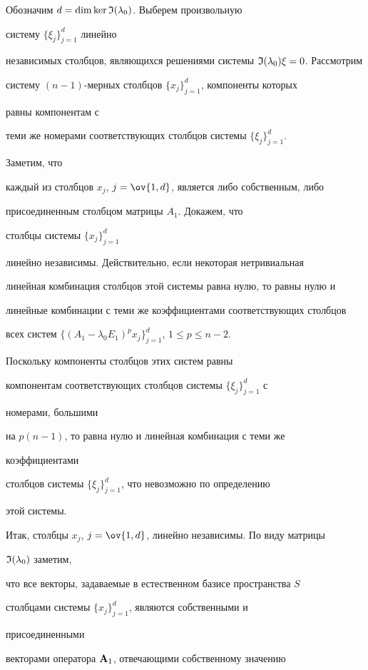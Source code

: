 \begin{pf} 


Обозначим $d=\dim\ker\frak I(\lambda_0)$. Выберем произвольную 


систему $\{\xi_j\}^d_{j=1}$ линейно 


независимых столбцов, являющихся решениями системы $\frak 


I(\lambda_0)\xi=0$. Рассмотрим 


систему $(n-1)$-мерных столбцов $\{x_j\}^d_{j=1}$, компоненты которых 


равны компонентам с 


теми же номерами соответствующих столбцов системы $\{\xi_j\}^d_{j=1}$. 


Заметим, что 


каждый из столбцов $x_j$, $j=\ov{1,d}$, является либо собственным, либо 


присоединенным столбцом матрицы $A_1$. Докажем, что 


столбцы системы $\{x_j\}^d_{j=1}$ 


линейно независимы. Действительно, если некоторая нетривиальная 


линейная комбинация столбцов этой системы равна нулю, то равны нулю и 


линейные комбинации с теми же коэффициентами соответствующих столбцов


всех систем $\{(A_1-\lambda_0E_1)^p x_j\}^d_{j=1}$, $1\le p\le n-2$. 


Поскольку компоненты столбцов этих систем равны 


компонентам соответствующих столбцов системы $\{\xi_j\}^d_{j=1}$ с 


номерами, большими 


на $p(n-1)$, то равна нулю и линейная комбинация с теми же 


коэффициентами 


столбцов системы $\{\xi_j\}^d_{j=1}$, что невозможно по определению 


этой системы. 


Итак, столбцы $x_j$, $j=\ov{1,d}$, линейно независимы. По виду матрицы 


$\frak I(\lambda_0)$ заметим, 


что все векторы, задаваемые в естественном базисе пространства $S$


столбцами системы $\{x_j\}^d_{j=1}$, являются собственными и 


присоединенными 


векторами оператора $\bold A_1$, отвечающими собственному значению 



\end{pf}
